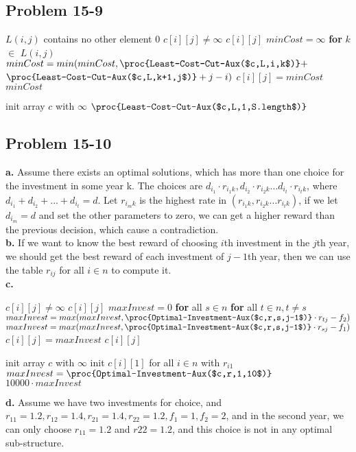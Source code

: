 \documentclass[12pt]{article}
\theoremstyle{definition}
\theoremstyle{remark}
\begin{document}
\subsection*{Problem 15-9}
\begin{codebox}
\li \If $L(i,j)$ contains no other element \label{li:if}
\li \quad \Return $0$
\li \If $c[i][j]\ne \infty$
\li \quad \Return $c[i][j]$
\li $minCost=\infty$
\li \textbf{for} $k$ $\in$ $L(i,j)$
\li \quad $minCost=min(minCost,\proc{Least-Cost-Cut-Aux($c,L,i,k$)}+$
\li \quad $\proc{Least-Cost-Cut-Aux($c,L,k+1,j$)}+j-i)$
\li $c[i][j]=minCost$
\li \Return $minCost$
\end{codebox}
\begin{codebox}
\li init array $c$ with $\infty$
\li $\proc{Least-Cost-Cut-Aux($c,L,1,S.length$)}$
\end{codebox}
\subsection*{Problem 15-10}
\textbf{a.} Assume there exists an optimal solutions, which has more than one choice for the investment in some year k. The choices are $d_{i_1}\cdot r_{i_1k},d_{i_2}\cdot r_{i_2k}...d_{i_t}\cdot r_{i_tk}$, where $d_{i_1}+d_{i_2}+...+d_{i_t}=d$. Let $r_{i_mk}$ is the highest rate in $(r_{i_1k},r_{i_2k}...r_{i_tk})$, if we let $d_{i_m}=d$ and set the other parameters to zero, we can get a higher reward than the previous decision, which cause a contradiction.\\
\textbf{b.} If we want to know the best reward of choosing $i$th investment in the $j$th year, we should get the best reward of each investment of $j-1$th year, then we can use the table $r_{ij}$ for all $i\in n$ to compute it.\\
\textbf{c.}
\begin{codebox}
\li \If $c[i][j]\ne \infty$ \label{li:if}
\li \quad \Return $c[i][j]$
\li $maxInvest=0$
\li \textbf{for} all $s\in n$
\li \quad \textbf{for} all $t\in n,t\ne s$
\li \qquad $maxInvest=max(maxInvest,\proc{Optimal-Investment-Aux($c,r,s,j-1$)}\cdot r_{tj}-f_2)$
\li \quad $maxInvest=max(maxInvest,\proc{Optimal-Investment-Aux($c,r,s,j-1$)}\cdot r_{sj}-f_1)$
\li $c[i][j]=maxInvest$
\li \Return $c[i][j]$
\end{codebox}
\begin{codebox}
\li init array $c$ with $\infty$
\li init $c[i][1]$ for all $i\in n$ with $r_{i1}$
\li $maxInvest=\proc{Optimal-Investment-Aux($c,r,1,10$)}$
\li \Return $10000\cdot maxInvest$
\end{codebox}
\textbf{d.}
Assume we have two investments for choice, and $r_{11}=1.2,r_{12}=1.4,r_{21}=1.4,r_{22}=1.2,f_1=1,f_2=2$, and in the second year, we can only choose $r_{11}=1.2$ and $r{22}=1.2$, and this choice is not in any optimal sub-structure.
\end{document}
